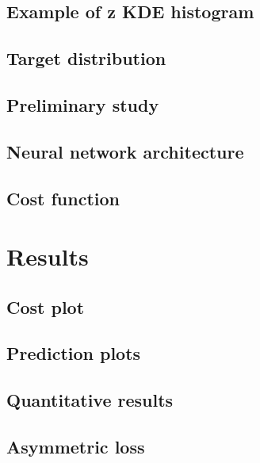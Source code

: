 \documentclass[aspectratio=169, 10pt]{beamer}
\begin{document}
\subsection{Example of z KDE histogram}


\subsection{Target distribution}


\subsection{Preliminary study}


\subsection{Neural network architecture}



\subsection{Cost function}



\section{Results}

\subsection{Cost plot}


\subsection{Prediction plots}


\subsection{Quantitative results}


\subsection{Asymmetric loss}

\end{document}
